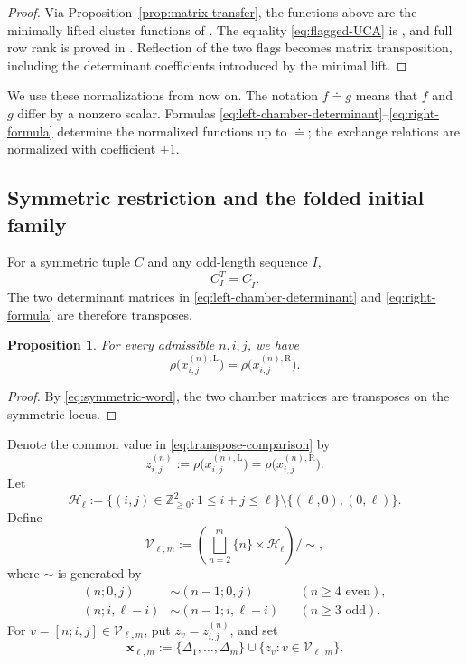 \documentclass[11pt]{amsart}
\newtheorem{proposition}[theorem]{Proposition}
\theoremstyle{definition}
\theoremstyle{remark}
\begin{document}
\begin{proof}
Via Proposition~\ref{prop:matrix-transfer}, the functions above are the
minimally lifted cluster functions of
\cite[Sections~4--5]{FeiKroneckerII}.  The equality
\eqref{eq:flagged-UCA} is \cite[Theorem~0.1]{FeiKroneckerII}, and full row
rank is proved in \cite[Section~5]{FeiKroneckerII}.  Reflection of the two
flags becomes
matrix transposition, including the determinant coefficients introduced by
the minimal lift.
\end{proof}

We use these normalizations from now on.  The notation $f\doteq g$ means
that $f$ and $g$ differ by a nonzero scalar.  Formulas
\eqref{eq:left-chamber-determinant}--\eqref{eq:right-formula} determine the
normalized functions up to $\doteq$; the exchange relations are normalized
with coefficient $+1$.

\subsection{Symmetric restriction and the folded initial family}
\label{subsec:folded-family}

For a symmetric tuple $C$ and any odd-length sequence $I$,
\begin{equation}
 C_I^T=C_{\overleftarrow I}.
 \label{eq:symmetric-word}
\end{equation}
The two determinant matrices in \eqref{eq:left-chamber-determinant} and
\eqref{eq:right-formula} are therefore transposes.

\begin{proposition}\label{prop:transpose-comparison}
For every admissible $n,i,j$, we have
\begin{equation}
 \rho\bigl(x_{i,j}^{(n),\mathrm L}\bigr)
 =\rho\bigl(x_{i,j}^{(n),\mathrm R}\bigr).
 \label{eq:transpose-comparison}
\end{equation}
\end{proposition}

\begin{proof}
By \eqref{eq:symmetric-word}, the two chamber matrices are transposes on the
symmetric locus.
\end{proof}

Denote the common value in \eqref{eq:transpose-comparison} by
\[ z_{i,j}^{(n)} :=\rho\bigl(x_{i,j}^{(n),\mathrm L}\bigr) =\rho\bigl(x_{i,j}^{(n),\mathrm R}\bigr). \]
Let
\[ \mathscr H_\ell :=\{(i,j)\in\mathbb Z_{\ge0}^2:1\le i+j\le\ell\} \setminus\{(\ell,0),(0,\ell)\}. \]
Define
\begin{equation}
 \mathscr V_{\ell,m}
 :=\left(\bigsqcup_{n=2}^m\{n\}\times\mathscr H_\ell\right)\big/\sim,
 \label{eq:V-index}
\end{equation}
where $\sim$ is generated by
\begin{align*}
 (n;0,j)&\sim(n-1;0,j)
 &&(n\ge4\text{ even}),\\
 (n;i,\ell-i)&\sim(n-1;i,\ell-i)
 &&(n\ge3\text{ odd}).
\end{align*}
For $v=[n;i,j]\in\mathscr V_{\ell,m}$, put $z_v=z_{i,j}^{(n)}$, and set
\[ \mathbf x_{\ell,m} :=\{\Delta_1,\ldots,\Delta_m\} \cup\{z_v:v\in\mathscr V_{\ell,m}\}. \]
\end{document}
